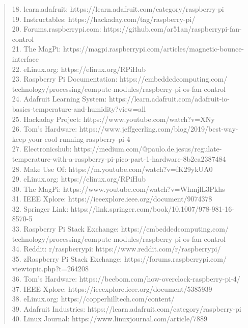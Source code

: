 \documentclass[12pt]{report}
\begin{document}
\begin{quote}
\begin{justifying}
			18. learn.adafruit: https://learn.adafruit.com/category/raspberry-pi\\
			19. Instructables: https://hackaday.com/tag/raspberry-pi/\\
			20. Forums.raspberrypi.com: https://github.com/ar51an/raspberrypi-fan-control\\
			21. The MagPi: https://magpi.raspberrypi.com/articles/magnetic-bounce-interface\\
			22. eLinux.org: https://elinux.org/RPiHub\\
			23. Raspberry Pi Documentation: https://embeddedcomputing.com/\\technology/processing/compute-modules/raspberry-pi-os-fan-control\\
			24. Adafruit Learning System: https://learn.adafruit.com/adafruit-io-basics-temperature-and-humidity?view=all\\
			25. Hackaday Project: https://www.youtube.com/watch?v=XNy\\
			26. Tom's Hardware: https://www.jeffgeerling.com/blog/2019/best-way-keep-your-cool-running-raspberry-pi-4\\
			27. Electronicshub: https://medium.com/@paulo.de.jesus/regulate-temperature-with-a-raspberry-pi-pico-part-1-hardware-8b2ea2387484\\
			28. Make Use Of: https://m.youtube.com/watch?v=fK29ykUA0\\
			29. eLinux.org: https://elinux.org/RPiHub\\
			30. The MagPi: https://www.youtube.com/watch?v=WhmjlL3Pkhs\\
			31. IEEE Xplore: https://ieeexplore.ieee.org/document/9074378\\
			32. Springer Link: https://link.springer.com/book/10.1007/978-981-16-8570-5\\
			33. Raspberry Pi Stack Exchange: https://embeddedcomputing.com/\\technology/processing/compute-modules/raspberry-pi-os-fan-control\\
			34. Reddit: r/raspberrypi: https://www.reddit.com/r/raspberrypi/\\
			35. zRaspberry Pi Stack Exchange: https://forums.raspberrypi.com/\\viewtopic.php?t=264208\\
			36. Tom's Hardware: https://beebom.com/how-overclock-raspberry-pi-4/\\
			37. IEEE Xplore: https://ieeexplore.ieee.org/document/5385939\\
			38. eLinux.org: https://copperhilltech.com/content/\\
			39. Adafruit Industries: https://learn.adafruit.com/category/raspberry-pi\\
			40. Linux Journal: https://www.linuxjournal.com/article/7889
			
		\end{justifying}
		

			\justifying
			
		\end{quote}
	
\end{document}
